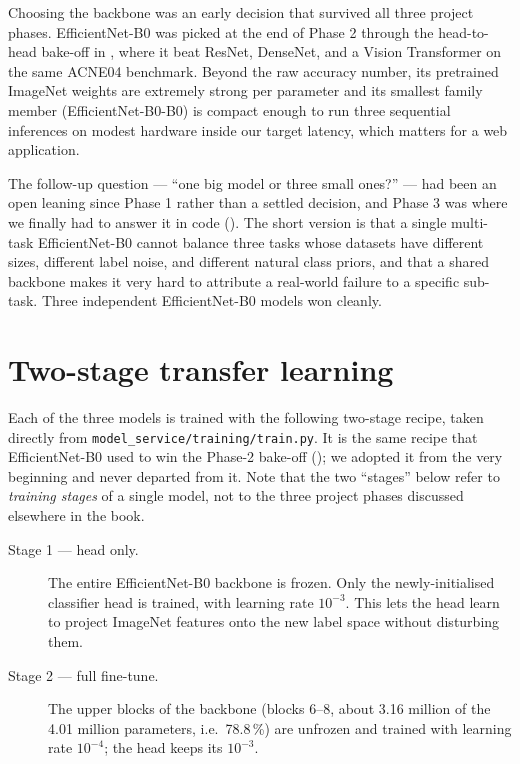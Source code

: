 \documentclass[11pt,a4paper,oneside]{report}
\newcommand{\effnet}{EfficientNet-B0\xspace}
\begin{document}
Choosing the backbone was an early decision that survived all three
project phases. \effnet was picked at the end of Phase 2 through the
head-to-head bake-off in , where it beat
ResNet, DenseNet, and a Vision Transformer on the same ACNE04
benchmark. Beyond the raw accuracy number, its pretrained ImageNet
weights are extremely strong per parameter and its smallest family
member (\effnet-B0) is compact enough to run three sequential
inferences on modest hardware inside our target latency, which
matters for a web application.

The follow-up question --- ``one big model or three small ones?''
--- had been an open leaning since Phase 1 rather than a settled
decision, and Phase 3 was where we finally had to answer it in code
(). The short version is that a single
multi-task \effnet cannot balance three tasks whose datasets have
different sizes, different label noise, and different natural class
priors, and that a shared backbone makes it very hard to attribute a
real-world failure to a specific sub-task. Three independent
\effnet models won cleanly.

\section{Two-stage transfer learning}\label{sec:two-phase}

Each of the three models is trained with the following two-stage
recipe, taken directly from
\texttt{model\_service/training/train.py}. It is the same recipe
that \effnet used to win the Phase-2 bake-off ();
we adopted it from the very beginning and never departed from it.
Note that the two ``stages'' below refer to \emph{training stages}
of a single model, not to the three project phases discussed
elsewhere in the book.

\begin{description}
    \item[Stage 1 --- head only.] The entire \effnet backbone is
        frozen. Only the newly-initialised classifier head is
        trained, with learning rate \(10^{-3}\). This lets the head
        learn to project ImageNet features onto the new label space
        without disturbing them.
    \item[Stage 2 --- full fine-tune.] The upper blocks of the
        backbone (blocks 6--8, about 3.16 million of the 4.01 million
        parameters, i.e.\ 78.8\,\%) are unfrozen and trained with
        learning rate \(10^{-4}\); the head keeps its
        \(10^{-3}\).
\end{description}
\end{document}
